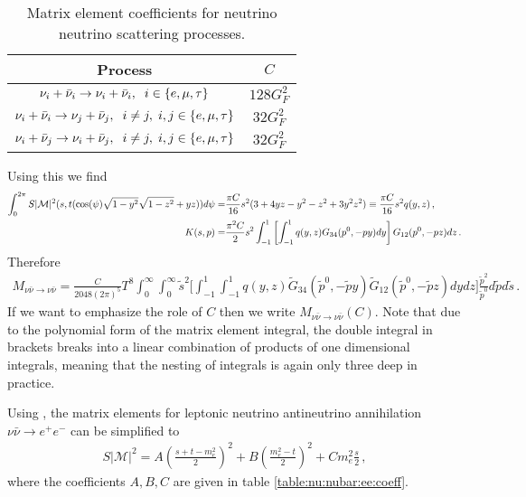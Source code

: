 \begin{table}[ht]
\centering 
\begin{tabular}{|c|c|}
\hline
Process &$C$  \\
\hline
$\nu_i+\bar\nu_i\rightarrow\nu_i+\bar\nu_i,\hspace{2mm} i\in\{e,\mu,\tau\}$& $128 G_F^2$\\
\hline
$\nu_i+\bar\nu_i\rightarrow\nu_j+\bar\nu_j,\hspace{2mm} i\neq j, \hspace{1mm} i,j\in\{e,\mu,\tau\}$& $32 G_F^2$\\
\hline
$\nu_i+\bar\nu_j\rightarrow\nu_i+\bar\nu_j,\hspace{2mm} i\neq j, \hspace{1mm} i,j\in\{e,\mu,\tau\}$& $32 G_F^2$\\
\hline
\end{tabular}
\caption{Matrix element coefficients for neutrino neutrino scattering processes.}
\label{table:nu:nubar:coeff}
\end{table}
Using this we find
 \begin{align}
\int_0^{2\pi} S |\mathcal{M}|^2 (s,t(\cos(\psi)\sqrt{1-y^2}\sqrt{1-z^2}+yz))d\psi 
=& \frac{\pi C}{16} s^2(3+4 yz-y^2-z^2+3y^2z^2)
\equiv\frac{\pi C}{16} s^2q(y,z)\,, \\
K(s,p)=&\frac{\pi^2C}{2}s^2\int_{-1}^1 \left[\int_{-1}^1q(y,z)G_{34}(p^0,-p y) dy\right] G_{12}(p^0,-p z)dz\,.\notag
\end{align}
Therefore
\begin{align}\label{eq:M:nu:nubar}
M_{\nu\bar\nu\rightarrow\nu\bar\nu}=\frac{C}{2048(2\pi)^5 }T^8\! \int_0^\infty\!\!\int_0^\infty\!\!\! \tilde{s}^2\bigg[\int_{-1}^1\!\int_{-1}^1q(y,z)\tilde{G}_{34}(\tilde p^0,-\tilde{p} y) 
\tilde{G}_{12}(\tilde p^0,-\tilde{p} z)dydz\bigg]\frac{\tilde{p}^2}{\tilde{p}^0}d\tilde{p}d\tilde{s}\,.
\end{align}
 If we want to emphasize the role of $C$ then we write $M_{\nu\bar\nu\rightarrow\nu\bar\nu}(C)$. Note that due to the polynomial form of the matrix element integral, the double integral in brackets breaks into a linear combination of products of one dimensional integrals, meaning that the nesting of integrals is again only three deep in  practice.

Using , the matrix elements for leptonic neutrino antineutrino annihilation $\nu\bar{\nu}\rightarrow e^+e^-$ can be simplified to
\begin{align}
S|\mathcal{M}|^2=A\left(\frac{s+t-m_e^2}{2}\right)^2+B\left(\frac{m_e^2-t}{2}\right)^2+Cm_e^2\frac{s}{2}\,,
\end{align}
where the coefficients $A,B,C$ are given in table \ref{table:nu:nubar:ee:coeff}.

